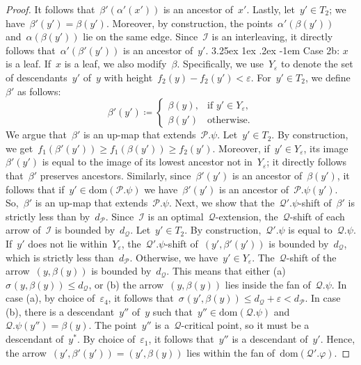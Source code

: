 \documentclass[11pt]{article}
\makeatletter
\newcommand{\dom}{\mathrm{dom}}
\newcommand{\shift}[1]{\sigma_{#1}}
\newcommand{\resdist}[1]{d_{#1}}
\newcommand{\eps}{\varepsilon}
\renewcommand{\phi}{\varphi}
\newcommand{\I}{\mathcal{I}}
\renewcommand{\P}{\mathcal{P}}
\newcommand{\Q}{\mathcal{Q}}
\newcommand{\proofsubparagraph}{\@startsection{subparagraph}{5}{\z@}%
                                       {3.25ex \@plus1ex \@minus .2ex}%
                                       {-1em}%
                                      {\color{lipicsGray}\sffamily\normalsize\bfseries}}
\makeatother
\begin{document}
\begin{proof}
    It follows that~$\beta'(\alpha'(x'))$ is an ancestor of~$x'$.
    Lastly, let~$y' \in T_2$; we have~$\beta'(y') = \beta(y')$.
    Moreover, by construction, the points~$\alpha'(\beta(y'))$ and~$\alpha(\beta(y'))$ lie on the same edge.
    Since~$\I$ is an interleaving, it directly follows that~$\alpha'(\beta'(y'))$ is an ancestor of~$y'$.
%
    \proofsubparagraph{Case 2b: $x$ is a leaf.}
    If~$x$ is a leaf, we also modify~$\beta$.
    Specifically, we use~$Y_\eps$ to denote the set of descendants~$y'$ of~$y$ with height~$f_2(y) - f_2(y') < \eps$. 
    For~$y' \in T_2$, we define~$\beta'$ as follows:
    \[
        \beta'(y') \coloneqq \begin{cases}
            \beta(y), & \text{if } y' \in Y_\eps, \\
            \beta(y') & \text{otherwise.}
        \end{cases}
    \]
%
    We argue that~$\beta'$ is an up-map that extends~$\P.\psi$.
    Let~$y' \in T_2$.
    By construction, we get~$f_1(\beta'(y')) \ge f_1(\beta(y')) \ge f_2(y')$.
    Moreover, if~$y' \in Y_\eps$, its image~$\beta'(y')$ is equal to the image of its lowest ancestor not in~$Y_\eps$; it directly follows that~$\beta'$ preserves ancestors.
    Similarly, since~$\beta'(y')$ is an ancestor of~$\beta(y')$, it follows that if~$y' \in \dom(\P.\psi)$ we have~$\beta'(y')$ is an ancestor of~$\P.\psi(y')$.
    So,~$\beta'$ is an up-map that extends~$\P.\psi$.
%
    Next, we show that the~$\Q'.\psi$-shift of~$\beta'$ is strictly less than by~$\resdist{\P}$.
    Since~$\I$ is an optimal~$\Q$-extension, the~$\Q$-shift of each arrow of~$\I$ is bounded by~$\resdist{\Q}$.
    Let~$y' \in T_2$.
    By construction,~$\Q'.\psi$ is equal to~$\Q.\psi$.
    If~$y'$ does not lie within~$Y_\eps$, the~$\Q'.\psi$-shift of~$(y', \beta'(y'))$ is bounded by~$\resdist{\Q}$, which is strictly less than~$\resdist{\P}$.
    Otherwise, we have~$y' \in Y_\eps$.
    The~$\Q$-shift of the arrow~$(y, \beta(y))$ is bounded by~$\resdist{\Q}$.
    This means that either (a)~$\shift{}(y, \beta(y)) \le \resdist{\Q}$, or (b) the arrow~$(y, \beta(y))$ lies inside the fan of~$\Q.\psi$.
    In case (a), by choice of~$\eps_4$, it follows that~$\shift{}(y', \beta(y)) \le \resdist{\Q} + \eps < \resdist{\P}$.
    In case (b), there is a descendant~$y''$ of~$y$ such that~$y'' \in \dom(\Q.\psi)$ and~$\Q.\psi(y'') = \beta(y)$.
    The point~$y''$ is a~$\Q$-critical point, so it must be a descendant of~$y^*$.
    By choice of~$\eps_1$, it follows that~$y''$ is a descendant of~$y'$.
    Hence, the arrow~$(y', \beta'(y')) = (y', \beta(y))$ lies within the fan of~$\dom(\Q'.\phi)$.

\end{proof}
\end{document}
